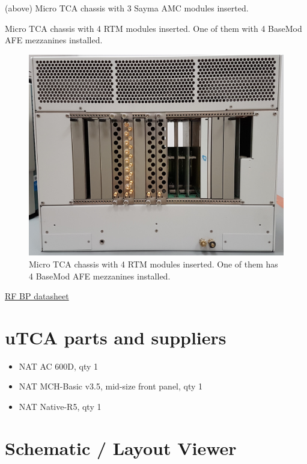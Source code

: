 
(above) Micro TCA chassis with 3 Sayma AMC modules inserted.

Micro TCA chassis with 4 RTM modules inserted. One of them with 4
BaseMod AFE mezzanines installed.

\begin{figure}[htbp!]
\centering
\includegraphics[width=15cm]{img/MTCA_Back.jpg}
\caption{Micro TCA chassis with 4 RTM modules inserted. One of them has
4 BaseMod AFE mezzanines installed.}
\end{figure}


\href{http://www.nateurope.com/products/NAT-LLRF-Backplane.html}{RF
BP datasheet}



\section{uTCA parts and suppliers}\label{utca-parts-and-suppliers}

\begin{itemize}
\item NAT AC 600D, qty 1
\item NAT MCH-Basic v3.5, mid-size front panel, qty 1
\item NAT Native-R5, qty 1
\end{itemize}

\section{Schematic / Layout Viewer}\label{schematic-layout-viewer}


